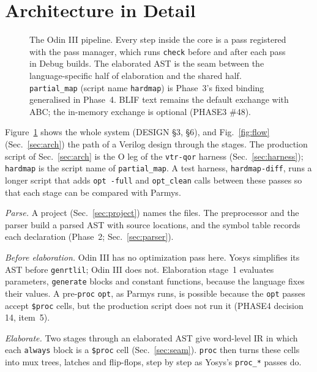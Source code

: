 \documentclass[conference]{IEEEtran}
\newcommand{\code}[1]{\texttt{#1}}
\begin{document}
\section{Architecture in Detail}
\label{sec:arch-detail}

\begin{figure}[t]
\centering
\odinfit{\textwidth}{}
\caption{The Odin III pipeline. Every step inside the core is a pass registered with the pass manager, which runs
\code{check} before and after each pass in Debug builds. The elaborated AST is the seam between
the language-specific half of elaboration and the shared half. \code{partial\_map} (script name
\code{hardmap}) is Phase~3's fixed binding generalised in Phase~4. BLIF text remains the default exchange with ABC; the in-memory exchange is optional (PHASE3 \#48).}
\label{fig:pipeline}
\end{figure}

Figure~\ref{fig:pipeline} shows the whole system (DESIGN \S3, \S6), and
Fig.~\ref{fig:flow} (Sec.~\ref{sec:arch}) the path of a Verilog design through the stages. The
production script of Sec.~\ref{sec:arch} is the O leg of the \code{vtr-qor} harness
(Sec.~\ref{sec:harness}); \code{hardmap} is the script name of \code{partial\_map}. A test harness,
\code{hardmap-diff}, runs a longer script that adds \code{opt -full} and \code{opt\_clean} calls
between these passes so that each stage can be compared with Parmys.

\emph{Parse.} A project (Sec.~\ref{sec:project}) names the files. The preprocessor and the parser
build a parsed AST with source locations, and the symbol table records each declaration
(Phase~2; Sec.~\ref{sec:parser}).

\emph{Before elaboration.} Odin III has no optimization pass here. Yosys simplifies its AST before
\code{genrtlil}; Odin III does not. Elaboration stage~1 evaluates parameters, \code{generate} blocks and
constant functions, because the language fixes their values. A pre-\code{proc} \code{opt}, as
Parmys runs, is possible because the \code{opt} passes accept \code{\$proc} cells, but the
production script does not run it (PHASE4 decision 14, item~5).

\emph{Elaborate.} Two stages through an elaborated AST give word-level IR in which each
\code{always} block is a \code{\$proc} cell (Sec.~\ref{sec:seam}). \code{proc} then turns these
cells into mux trees, latches and flip-flops, step by step as Yosys's \code{proc\_*} passes do.
\end{document}
